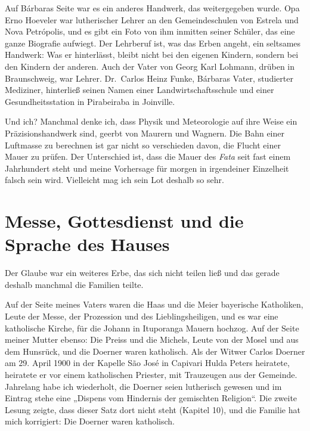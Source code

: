 \documentclass[
  ngerman,
  11pt,
  openany]{book}
\begin{document}
Auf Bárbaras Seite war es ein anderes Handwerk, das weitergegeben wurde.
Opa Erno Hoeveler war lutherischer Lehrer an den Gemeindeschulen von
Estrela und Nova Petrópolis, und es gibt ein Foto von ihm inmitten
seiner Schüler, das eine ganze Biografie aufwiegt. Der Lehrberuf ist,
was das Erben angeht, ein seltsames Handwerk: Was er hinterlässt, bleibt
nicht bei den eigenen Kindern, sondern bei den Kindern der anderen. Auch
der Vater von Georg Karl Lohmann, drüben in Braunschweig, war Lehrer.
Dr.~Carlos Heinz Funke, Bárbaras Vater, studierter Mediziner, hinterließ
seinen Namen einer Landwirtschaftsschule und einer Gesundheitsstation in
Pirabeiraba in Joinville.

Und ich? Manchmal denke ich, dass Physik und Meteorologie auf ihre Weise
ein Präzisionshandwerk sind, geerbt von Maurern und Wagnern. Die Bahn
einer Luftmasse zu berechnen ist gar nicht so verschieden davon, die
Flucht einer Mauer zu prüfen. Der Unterschied ist, dass die Mauer des
\emph{Fata} seit fast einem Jahrhundert steht und meine Vorhersage für
morgen in irgendeiner Einzelheit falsch sein wird. Vielleicht mag ich
sein Lot deshalb so sehr.

\section{Messe, Gottesdienst und die Sprache des
Hauses}\label{messe-gottesdienst-und-die-sprache-des-hauses}

Der Glaube war ein weiteres Erbe, das sich nicht teilen ließ und das
gerade deshalb manchmal die Familien teilte.

Auf der Seite meines Vaters waren die Haas und die Meier bayerische
Katholiken, Leute der Messe, der Prozession und des Lieblingsheiligen,
und es war eine katholische Kirche, für die Johann in Ituporanga Mauern
hochzog. Auf der Seite meiner Mutter ebenso: Die Preiss und die Michels,
Leute von der Mosel und aus dem Hunsrück, und die Doerner waren
katholisch. Als der Witwer Carlos Doerner am 29. April 1900 in der
Kapelle São José in Capivari Hulda Peters heiratete, heiratete er vor
einem katholischen Priester, mit Trauzeugen aus der Gemeinde. Jahrelang
habe ich wiederholt, die Doerner seien lutherisch gewesen und im Eintrag
stehe eine „Dispens vom Hindernis der gemischten Religion``. Die zweite
Lesung zeigte, dass dieser Satz dort nicht steht (Kapitel 10), und die
Familie hat mich korrigiert: Die Doerner waren katholisch.
\end{document}
